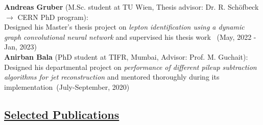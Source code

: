 \documentclass[a4paper,11pt]{article}
\begin{document}
{\textbf{Andreas Gruber} (M.Sc. student at TU Wien, Thesis advisor: Dr. R. Sch{\"o}fbeck $\rightarrow$ CERN PhD program):\\
Designed his Master's thesis project on \textit{lepton identification using a dynamic graph convolutional neural network} and supervised his thesis work ~(May, 2022 - Jan, 2023)\\
\textbf{Anirban Bala} (PhD student at TIFR, Mumbai, Advisor: Prof. M. Guchait):\\
Designed his departmental project on \textit{performance of different pileup subtraction algorithms for jet reconstruction} and mentored thoroughly during its implementation~(July-September, 2020)


\subsection*{\underline{Selected Publications}}

}
\end{document}
